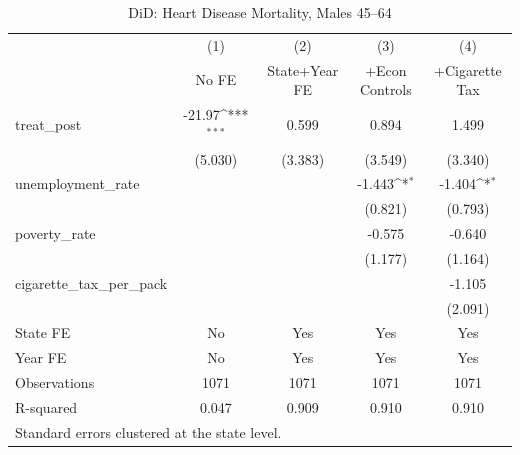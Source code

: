 \begin{table}[htbp]\centering
\def\sym#1{\ifmmode^{#1}\else\(^{#1}\)\fi}
\caption{DiD: Heart Disease Mortality, Males 45--64}
\begin{tabular}{l*{4}{c}}
\toprule
                    &\multicolumn{1}{c}{(1)}&\multicolumn{1}{c}{(2)}&\multicolumn{1}{c}{(3)}&\multicolumn{1}{c}{(4)}\\
                    &\multicolumn{1}{c}{No FE}&\multicolumn{1}{c}{State+Year FE}&\multicolumn{1}{c}{+Econ Controls}&\multicolumn{1}{c}{+Cigarette Tax}\\
\midrule
treat\_post          &      -21.97\sym{***}&       0.599         &       0.894         &       1.499         \\
                    &     (5.030)         &     (3.383)         &     (3.549)         &     (3.340)         \\
\addlinespace
unemployment\_rate   &                     &                     &      -1.443\sym{*}  &      -1.404\sym{*}  \\
                    &                     &                     &     (0.821)         &     (0.793)         \\
\addlinespace
poverty\_rate        &                     &                     &      -0.575         &      -0.640         \\
                    &                     &                     &     (1.177)         &     (1.164)         \\
\addlinespace
cigarette\_tax\_per\_pack&                     &                     &                     &      -1.105         \\
                    &                     &                     &                     &     (2.091)         \\
\midrule
State FE            &          No         &         Yes         &         Yes         &         Yes         \\
Year FE             &          No         &         Yes         &         Yes         &         Yes         \\
Observations        &        1071         &        1071         &        1071         &        1071         \\
R-squared           &       0.047         &       0.909         &       0.910         &       0.910         \\
\bottomrule
\multicolumn{5}{l}{\footnotesize Standard errors clustered at the state level.}\\
\end{tabular}
\end{table}
